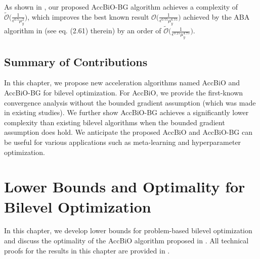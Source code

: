 \documentclass{osudissert96}
\begin{document}
As shown in , our proposed AccBiO-BG algorithm achieves a complexity  of $\mathcal{\widetilde O}\big(\frac{1}{\epsilon^{0.5}\mu_y^2}\big)$, which improves the best known result $\mathcal{O}\big(\frac{1}{\epsilon^{0.75}\mu_y^{6.75}}\big)$ achieved by the ABA algorithm in \cite{ghadimi2018approximation} (see eq. (2.61) therein) by an order of $\mathcal{\widetilde O}\big(\frac{1}{\epsilon^{0.25}\mu_y^{4.75}}\big)$. 



\section{Summary of Contributions}
In this chapter, we propose new acceleration algorithms named AccBiO and AccBiO-BG for bilevel optimization. 
For AccBiO, we provide the first-known convergence analysis without the bounded gradient assumption (which was made in existing studies). We further show AccBiO-BG achieves a significantly lower complexity than existing bilevel algorithms when the bounded gradient assumption does hold. We anticipate the proposed AccBiO and AccBiO-BG can be useful for various applications such as meta-learning and hyperparameter optimization. 

\chapter{Lower Bounds and Optimality for Bilevel Optimization}\label{chp_lower_bilevel}

In this chapter,  we develop lower bounds for problem-based bilevel optimization and discuss the optimality of the   AccBiO algorithm proposed in .  All technical proofs for the results in this chapter are provided in . 

\end{document}
